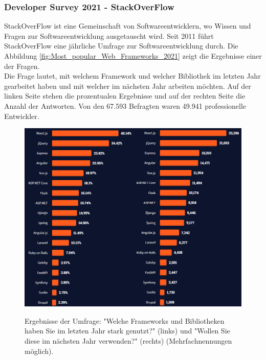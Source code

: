 \subsubsection*{Developer Survey 2021 - StackOverFlow}
StackOverFlow ist eine Gemeinschaft von Softwareentwicklern, wo Wissen und Fragen zur Softwareentwicklung ausgetauscht wird. Seit 2011 führt StackOverFlow eine jährliche Umfrage zur Softwareentwicklung durch.
Die Abbildung \autoref{fig:Most_popular_Web_Frameworks_2021} zeigt die Ergebnisse einer der Fragen. \\
Die Frage lautet, mit welchem Framework und welcher Bibliothek im letzten Jahr gearbeitet haben und mit welcher im nächsten Jahr arbeiten möchten. Auf der linken Seite stehen die prozentualen Ergebnisse und auf der rechten Seite die Anzahl der Antworten. Von den 67.593 Befragten waren 49.941 professionelle Entwickler. 
  
  \begin{figure}[h!]
    \centering
    \includegraphics[scale=0.5]{sources/Most_popular_Web_Frameworks_2021}
    \caption[Most popular Web Frameworks 2021]{}
    \label{fig:Most_popular_Web_Frameworks_2021} 
    Ergebnisse der Umfrage: "Welche Frameworks und Bibliotheken haben Sie im letzten Jahr stark genutzt?" (links) und "Wollen Sie diese im nächsten Jahr verwenden?" (rechts) (Mehrfachnennungen möglich)\cite{SO01}.
  \end{figure}

